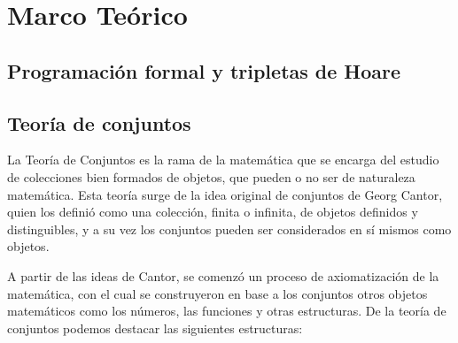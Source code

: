 \chapter{Marco Teórico}
\label{capitulo1}

\section{Programación formal y tripletas de Hoare}

\section{Teoría de conjuntos}

La Teoría de Conjuntos es la rama de la matemática que se encarga del estudio de
colecciones bien formados de objetos, que pueden o no ser de naturaleza
matemática. Esta teoría surge de la idea original de conjuntos de Georg Cantor,
quien los definió como una colección, finita o infinita, de objetos definidos y
distinguibles, y a su vez los conjuntos pueden ser considerados en sí mismos
como objetos.

A partir de las ideas de Cantor, se comenzó un proceso de axiomatización de la
matemática, con el cual se construyeron en base a los conjuntos otros objetos
matemáticos como los números, las funciones y otras estructuras. De la teoría de
conjuntos podemos destacar las siguientes estructuras:

